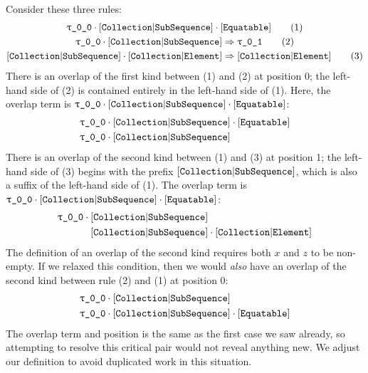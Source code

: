 \documentclass[../generics]{subfiles}
\begin{document}
\begin{example}
Consider these three rules:
\begin{gather*}
\rT\cdot\assocsym{Collection}{SubSequence}\cdot\protosym{Equatable}\tag{1}\\
\rT\cdot\assocsym{Collection}{SubSequence}\Rightarrow\rU\tag{2}\\
\assocsym{Collection}{SubSequence}\cdot\assocsym{Collection}{Element}\Rightarrow\assocsym{Collection}{Element}\tag{3}
\end{gather*}
There is an overlap of the first kind between (1) and (2) at position 0; the left-hand side of (2) is contained entirely in the left-hand side of (1). Here, the overlap term is $\rT\cdot\assocsym{Collection}{SubSequence}\cdot\protosym{Equatable}$:
\begin{align*}
&\rT\cdot\assocsym{Collection}{SubSequence}\cdot\protosym{Equatable}\\
&\rT\cdot\assocsym{Collection}{SubSequence}
\end{align*}
There is an overlap of the second kind between (1) and (3) at position 1; the left-hand side of (3) begins with the prefix $[\texttt{Collection}|\texttt{SubSequence}]$, which is also a suffix of the left-hand side of (1). The overlap term is $\rT\cdot\assocsym{Collection}{SubSequence}\cdot\protosym{Equatable}$:
\begin{align*}
\rT\cdot{}&\assocsym{Collection}{SubSequence}\\
&\assocsym{Collection}{SubSequence}\cdot\assocsym{Collection}{Element}
\end{align*}
The definition of an overlap of the second kind requires both $x$ and $z$ to be non-empty. If we relaxed this condition, then we would \emph{also} have an overlap of the second kind between rule (2) and (1) at position 0:
\begin{align*}
&\rT\cdot\assocsym{Collection}{SubSequence}\\
&\rT\cdot\assocsym{Collection}{SubSequence}\cdot\protosym{Equatable}
\end{align*}
The overlap term and position is the same as the first case we saw already, so attempting to resolve this critical pair would not reveal anything new. We adjust our definition to avoid duplicated work in this situation.


\end{example}
\end{document}
